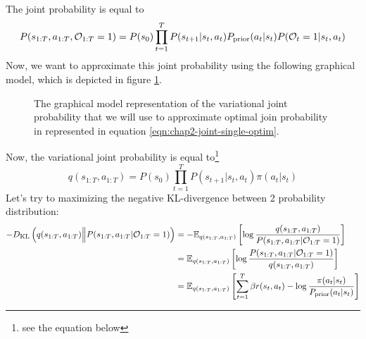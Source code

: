 The joint probability is equal to
\begin{equation}
\label{eqn:chap2-joint-single-optim}
    P(s_{1:T}, a_{1:T}, \mathcal{O}_{1:T} = 1) = P(s_0) \prod^{T}_{t=1} P(s_{t+1} | s_t, a_t) P_{\text{prior}}(a_t | s_t) P(\mathcal{O}_t = 1 | s_t, a_t)
\end{equation}
Now, we want to approximate this joint probability using the following graphical model, which is depicted in figure \ref{fig:chap2-single-graphical-approx}.
\begin{figure}[ht]
    \begin{minipage}[t]{0.5\linewidth}
    \centering
    \end{minipage}%
    \begin{minipage}[t]{0.5\linewidth}
    \caption{The graphical model representation of the variational joint probability that we will use to approximate optimal join probability in represented in equation \ref{eqn:chap2-joint-single-optim}. }
    \label{fig:chap2-single-graphical-approx}
    \end{minipage}
\end{figure}
Now, the variational joint probability is equal to\footnote{see the equation below}
\begin{equation}
    q(s_{1:T}, a_{1:T}) = P(s_0) \prod^{T}_{t=1} P(s_{t+1} | s_t, a_t) \pi(a_t | s_t) 
\end{equation}
Let's try to maximizing the negative KL-divergence between 2 probability distribution:
\begin{equation}
\begin{aligned}
    -D_{\mathrm{KL}}\left( q(s_{1:T}, a_{1:T}) \Big\| P(s_{1:T}, a_{1:T} | \mathcal{O}_{1:T} = 1) \right) &= -\mathbb{E}_{q(s_{1:T}, a_{1:T})}\left[ \log\frac{q(s_{1:T}, a_{1:T})}{P(s_{1:T}, a_{1:T} | \mathcal{O}_{1:T} = 1)} \right] \\
    &=\mathbb{E}_{q(s_{1:T}, a_{1:T})}\left[ \log\frac{P(s_{1:T}, a_{1:T} | \mathcal{O}_{1:T} = 1)}{q(s_{1:T}, a_{1:T})} \right] \\
    &= \mathbb{E}_{q(s_{1:T}, a_{1:T})} \left[ \sum^{T}_{t=1} \beta r(s_t, a_t) - \log \frac{\pi(a_t | s_t)}{P_{\text{prior}}(a_t | s_t)}  \right]
\end{aligned}
\end{equation}
